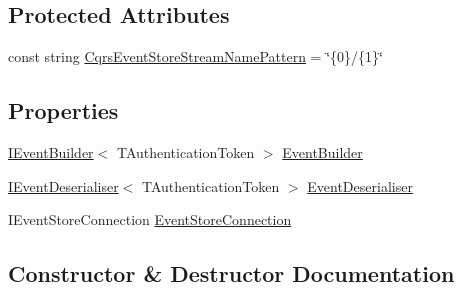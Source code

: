 \subsection*{Protected Attributes}
\begin{DoxyCompactItemize}
\item 
const string \hyperlink{classCqrs_1_1EventStore_1_1EventStore_ae9733f8511daf86ae3dac78bcbc5b2f0_ae9733f8511daf86ae3dac78bcbc5b2f0}{Cqrs\+Event\+Store\+Stream\+Name\+Pattern} = \char`\"{}\{0\}/\{1\}\char`\"{}
\end{DoxyCompactItemize}
\subsection*{Properties}
\begin{DoxyCompactItemize}
\item 
\hyperlink{interfaceCqrs_1_1EventStore_1_1IEventBuilder}{I\+Event\+Builder}$<$ T\+Authentication\+Token $>$ \hyperlink{classCqrs_1_1EventStore_1_1EventStore_ae1bc9d364582e951ccdc0f91908b94a2_ae1bc9d364582e951ccdc0f91908b94a2}{Event\+Builder}
\item 
\hyperlink{interfaceCqrs_1_1EventStore_1_1IEventDeserialiser}{I\+Event\+Deserialiser}$<$ T\+Authentication\+Token $>$ \hyperlink{classCqrs_1_1EventStore_1_1EventStore_a2b9140681d6bd25afb3a842e4cbf37cf_a2b9140681d6bd25afb3a842e4cbf37cf}{Event\+Deserialiser}
\item 
I\+Event\+Store\+Connection \hyperlink{classCqrs_1_1EventStore_1_1EventStore_ab1184aea49c7b0009a8f27d38f585952_ab1184aea49c7b0009a8f27d38f585952}{Event\+Store\+Connection}
\end{DoxyCompactItemize}


\subsection{Constructor \& Destructor Documentation}
\mbox{\label{classCqrs_1_1EventStore_1_1EventStore_ab48ad2c9d72780ae3a662e213498f194_ab48ad2c9d72780ae3a662e213498f194}} 
